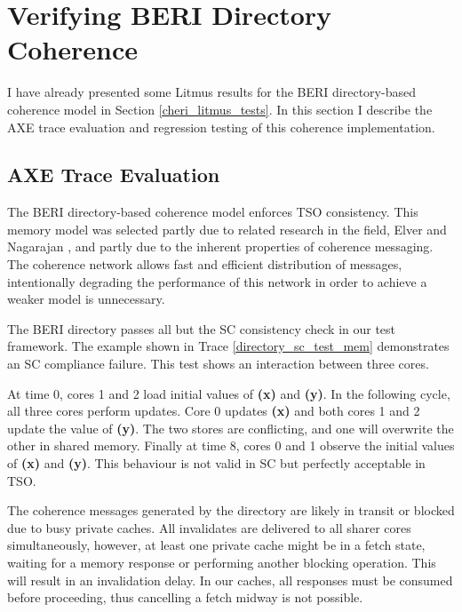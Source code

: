 \section{Verifying BERI Directory Coherence}
	I have already presented some Litmus results for the BERI directory-based coherence model in Section \ref{cheri_litmus_tests}. In this section I describe the AXE trace evaluation and regression testing of this coherence implementation.

	\subsection{AXE Trace Evaluation}
		The BERI directory-based coherence model enforces TSO consistency. This memory model was selected partly due to related research in the field, Elver and Nagarajan \cite{Elver14}, and partly due to the inherent properties of coherence messaging. The coherence network allows fast and efficient distribution of messages, intentionally degrading the performance of this network in order to achieve a weaker model is unnecessary. 

		The BERI directory passes all but the SC consistency check in our test framework. The example shown in Trace \ref{directory_sc_test_mem} demonstrates an SC compliance failure. This test shows an interaction between three cores. 
		
		At time 0, cores 1 and 2 load initial values of \textbf{(x)} and \textbf{(y)}. In the following cycle, all three cores perform updates. Core 0 updates \textbf{(x)} and both cores 1 and 2 update the value of \textbf{(y)}. The two stores are conflicting, and one will overwrite the other in shared memory. Finally at time 8, cores 0 and 1 observe the initial values of \textbf{(x)} and \textbf{(y)}. This behaviour is not valid in SC but perfectly acceptable in TSO. 
		
		The coherence messages generated by the directory are likely in transit or blocked due to busy private caches. All invalidates are delivered to all sharer cores simultaneously, however, at least one private cache might be in a fetch state, waiting for a memory response or performing another blocking operation. This will result in an invalidation delay. In our caches, all responses must be consumed before proceeding, thus cancelling a fetch midway is not possible.

